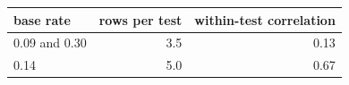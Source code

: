 \begin{tabular}{lrr}
\toprule
base rate & rows per test & within-test correlation \\
\midrule
0.09 and 0.30 & 3.5 & 0.13 \\
0.14 & 5.0 & 0.67 \\
\bottomrule
\end{tabular}
